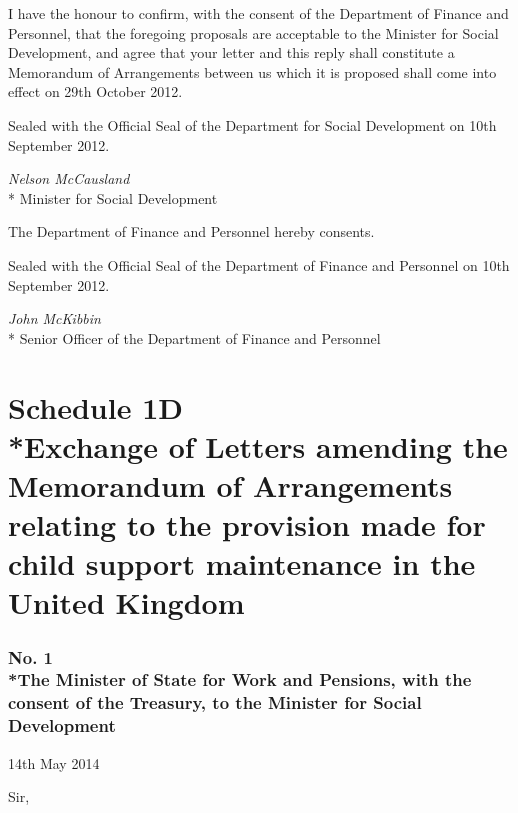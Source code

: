 \documentclass[12pt,a4paper]{article}
\begin{document}
I have the honour to confirm, with the consent of the Department of Finance and Personnel, that the foregoing proposals are acceptable to the Minister for Social Development, and agree that your letter and this reply shall constitute a Memorandum of Arrangements between us which it is proposed shall come into effect on 29th October 2012.

\bigskip

\pagebreak[3]

Sealed with the Official Seal of the Department for Social Development on 10th September 2012.

{\raggedleft
\emph{Nelson McCausland}\\*
Minister for Social Development

}

\bigskip

\pagebreak[3]

The Department of Finance and Personnel hereby consents.

Sealed with the Official Seal of the Department of Finance and Personnel on 10th September 2012.

{\raggedleft
\emph{John McKibbin}\\*
Senior Officer of the Department of Finance and Personnel

}

\vfill

\part[Schedule 1D --- Exchange of Letters amending the Memorandum of Arrangements relating to the provision made for child support maintenance in the United Kingdom]{Schedule 1D\\*Exchange of Letters amending the Memorandum of Arrangements relating to the provision made for child support maintenance in the United Kingdom}

\renewcommand\parthead{--- Schedule 1D}

\section*{\sloppy No. 1\\*The Minister of State for Work and Pensions, with the consent of the Treasury, to the Minister for Social Development}

14th May 2014

Sir,
\end{document}
